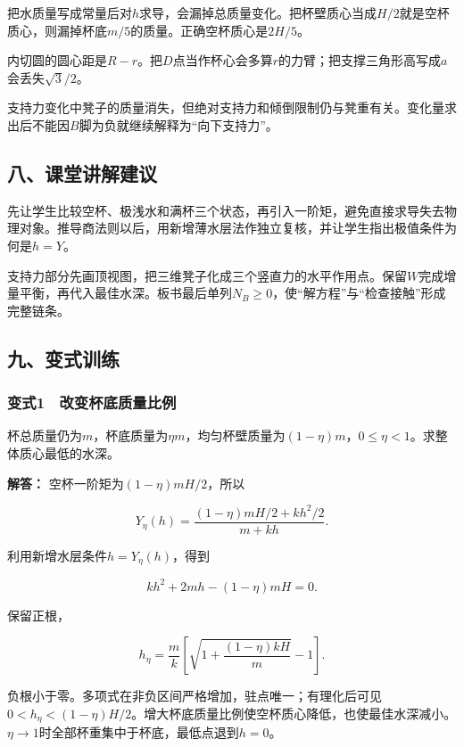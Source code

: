\documentclass[12pt,a4paper,fontset=fandol]{ctexart}
\begin{document}
把水质量写成常量后对\(h\)求导，会漏掉总质量变化。把杯壁质心当成\(H/2\)就是空杯质心，则漏掉杯底\(m/5\)的质量。正确空杯质心是\(2H/5\)。

内切圆的圆心距是\(R-r\)。把\(D\)点当作杯心会多算\(r\)的力臂；把支撑三角形高写成\(a\)会丢失\(\sqrt3/2\)。

支持力变化中凳子的质量消失，但绝对支持力和倾倒限制仍与凳重有关。变化量求出后不能因\(B\)脚为负就继续解释为``向下支持力''。

\subsection{八、课堂讲解建议}\label{ux516bux8bfeux5802ux8bb2ux89e3ux5efaux8bae}

先让学生比较空杯、极浅水和满杯三个状态，再引入一阶矩，避免直接求导失去物理对象。推导商法则以后，用新增薄水层法作独立复核，并让学生指出极值条件为何是\(h=Y\)。

支持力部分先画顶视图，把三维凳子化成三个竖直力的水平作用点。保留\(W\)完成增量平衡，再代入最佳水深。板书最后单列\(N_B\ge0\)，使``解方程''与``检查接触''形成完整链条。

\subsection{九、变式训练}\label{ux4e5dux53d8ux5f0fux8badux7ec3}

\subsubsection{变式1　改变杯底质量比例}\label{ux53d8ux5f0f1-ux6539ux53d8ux676fux5e95ux8d28ux91cfux6bd4ux4f8b}

杯总质量仍为\(m\)，杯底质量为\(\eta m\)，均匀杯壁质量为\((1-\eta)m\)，\(0\le\eta<1\)。求整体质心最低的水深。

\textbf{解答：} 空杯一阶矩为\((1-\eta)mH/2\)，所以

\[
Y_\eta(h)=\frac{(1-\eta)mH/2+kh^2/2}{m+kh}.
\]

利用新增水层条件\(h=Y_\eta(h)\)，得到

\[
kh^2+2mh-(1-\eta)mH=0.
\]

保留正根，

\[
\boxed{h_\eta=\frac m k
\left[\sqrt{1+\frac{(1-\eta)kH}m}-1\right]}.
\]

负根小于零。多项式在非负区间严格增加，驻点唯一；有理化后可见\(0<h_\eta<(1-\eta)H/2\)。增大杯底质量比例使空杯质心降低，也使最佳水深减小。\(\eta\to1\)时全部杯重集中于杯底，最低点退到\(h=0\)。
\end{document}
